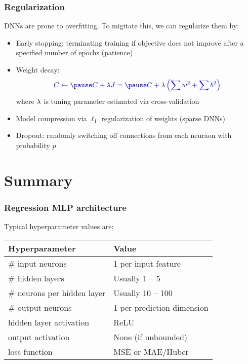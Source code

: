 \documentclass[smaller, handout]{beamer}
\begin{document}
\begin{frame}
  \frametitle{Regularization}
  \pe
  DNNs are prone to overfitting. \pe To migitate this, we can regularize them by: \pe
  \begin{itemize}
  \item Early stopping: terminating training if objective does not improve after a specified number of epochs (patience) \pe
  \item Weight decay: \pe
     \begin{equation}\bl 
      C \leftarrow \pause C + \la J = \pause C + \la\lt(\sum w^2 + \sum b^2\rt)
    \end{equation}
    \pause where $\lambda$ is tuning parameter estimated via cross-validation
  \pe
\item Model compression via $\ell_{1}$ regularization of weights (sparse DNNs) \pe
\item Dropout: \pe randomly switching off connections from each neuraon with probability $p$
    \end{itemize}

\end{frame}

\section{Summary}

\begin{frame}
  \frametitle{Regression MLP architecture}
  \pause
  Typical hyperparameter values are: \pause

  \begin{table}\centering
  \begin{tabular}[t]{l l}
    \bf Hyperparameter & \bf Value \\\midrule
    \# input neurons & 1 per input feature \\[2mm]\pause
    \# hidden layers & Usually 1 -- 5 \\[2mm]\pause
    \# neurons per hidden layer & Usually 10 -- 100 \\[2mm]\pause
    \# output neurons & 1 per prediction dimension \\[2mm]\pause
    hidden layer activation & ReLU \\[2mm]\pause
    output activation & None (if unbounded) \\[2mm]\pause
    loss function & MSE or MAE/Huber
  \end{tabular}
\end{table}
\end{frame}
\end{document}
